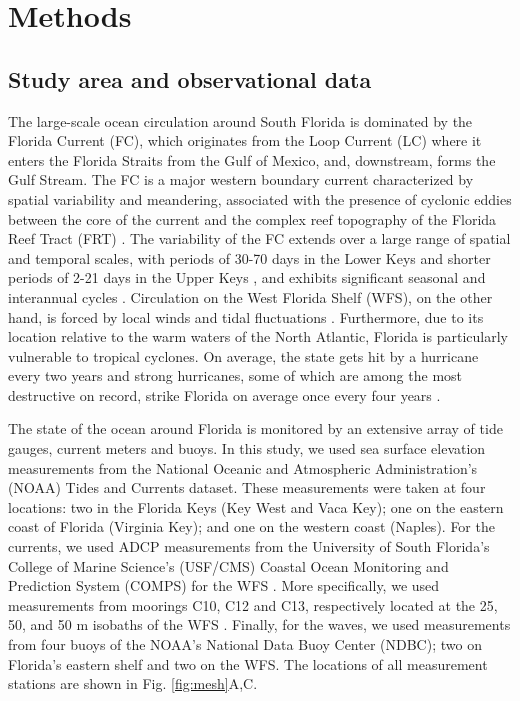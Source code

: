 \documentclass[preprint,12pt,authoryear]{elsarticle}
\begin{document}
\section{Methods}
\subsection{Study area and observational data}
The large-scale ocean circulation around South Florida is dominated by the Florida Current (FC), which originates from the Loop Current (LC) where it enters the Florida Straits from the Gulf of Mexico, and, downstream, forms the Gulf Stream. The FC is a major western boundary current characterized by spatial variability and meandering, associated with the presence of cyclonic eddies between the core of the current and the complex reef topography of the Florida Reef Tract (FRT) \citep{lee1995florida,kourafalou2012florida}.
The variability of the FC extends over a large range of spatial and temporal scales, with periods of 30-70 days in the Lower Keys \citep{lee1995florida} and shorter periods of 2-21 days in the Upper Keys \citep{lee1977low}, and exhibits significant seasonal and interannual cycles \citep{johns1987meandering, lee1988wind,schott1988variability}. Circulation on the West Florida Shelf (WFS), on the other hand, is forced by local winds and tidal fluctuations \citep{lee2002volume,liu2012seasonal}. Furthermore, due to its location relative to the warm waters of the North Atlantic, Florida is particularly vulnerable to tropical cyclones. On average, the state gets hit by a hurricane every two years and strong hurricanes, some of which are among the most destructive on record, strike Florida on average once every four years \citep{malmstadt2009florida}.

The state of the ocean around Florida is monitored by an extensive array of tide gauges, current meters and buoys. In this study, we used sea surface elevation measurements from the National Oceanic and Atmospheric Administration’s (NOAA) Tides and Currents dataset. These measurements were taken at four locations: two in the Florida Keys (Key West and Vaca Key); one on the eastern coast of Florida (Virginia Key); and one on the western coast (Naples). For the currents, we used ADCP measurements from the University of South Florida's College of Marine Science's (USF/CMS) Coastal Ocean Monitoring and Prediction System (COMPS) for the WFS \citep{weisberg2009mean}. More specifically, we used measurements from moorings C10, C12 and C13, respectively located at the 25, 50, and 50 m isobaths of the WFS \citep{liu2020impacts}. Finally, for the waves, we used measurements from four buoys of the NOAA's National Data Buoy Center (NDBC); two on Florida's eastern shelf and two on the WFS. The locations of all measurement stations are shown in Fig. \ref{fig:mesh}A,C.
\end{document}
